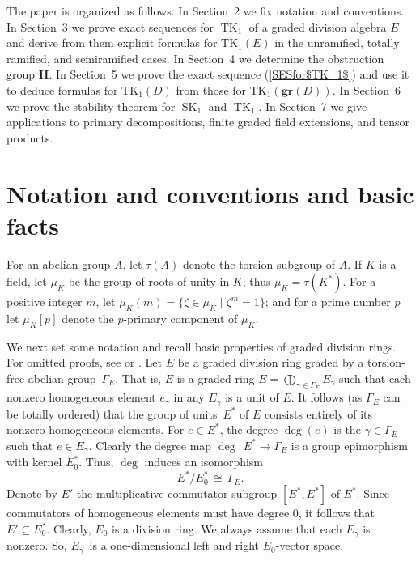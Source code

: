 \documentclass[11pt]{article}
\numberwithin{equation}{section}
\theoremstyle{plain}
\theoremstyle{remark}
\newcommand{\gr}{\mathbf{gr}}
\newcommand{\opn}{\operatorname}
\newcommand{\TK}{\opn{TK_1}}
\begin{document}
The paper is organized as follows. In Section~2 we fix notation and conventions. In Section~3 we prove exact sequences 
for $\operatorname{TK}_1$ of a graded division algebra $E$ and derive from them explicit formulas for $\TK(E)$ in the 
unramified, totally ramified, and semiramified cases. In Section~4 we determine the obstruction group $\mathbf{H}$. In 
Section~5 we prove the exact sequence (\ref{SESfor$TK_1$}) and use it to deduce formulas for $\TK(D)$ from those 
for $\TK(\gr(D))$.
In Section~6 we prove the stability theorem for $\operatorname{SK}_1$ and $\operatorname{TK}_1$. 
In Section~7 we give applications to primary decompositions, finite graded field extensions, and tensor products.


\section{Notation and conventions and basic facts}\label{sec:notation}
For an abelian group $A$, let $\tau(A)$ denote the torsion subgroup of $A$. If $K$ is a field, let $\mu_K$ be 
the group of roots of unity in $K$; thus $\mu_K = \tau(K^*)$.  For a positive integer $m$, let 
$\mu_K(m)=\{\zeta\in\mu_K\mid \zeta^m=1\}$; and for a prime number $p$ let 
$\mu_K[p]$ denote the $p$-primary component of $\mu_K$.

We next set some notation and recall basic properties of graded division rings.  For omitted proofs, see
\cite{hazrat-wadsworth-2011} or \cite{tignol-wadsworth-2015}.  Let $E$ be a graded division ring graded by 
a torsion-free abelian group~$\Gamma_E$.  That is, $E$ is a graded ring 
$E =\bigoplus_{\gamma\in \Gamma_E} E_\gamma$ such that each nonzero homogeneous element $e_\gamma$
in any $E_\gamma$ is a unit of $E$.  It follows (as $\Gamma_E$ can be totally ordered) that the group of 
units~$E^*$ of $E$ consists entirely of its nonzero homogeneous elements.  
For $e\in E^*$, the degree $\opn{deg}(e)$ is the $\gamma\in \Gamma_E$ such that $e\in E_\gamma$.  Clearly
the degree map $\deg\colon E^* \to \Gamma_E$ is  a group epimorphism with kernel $E_0^*$.  Thus, $\opn{deg}$
induces an isomorphism
\begin{equation}
\label{degiso}
E^*/E_0^* \, \cong\, \Gamma_E.
\end{equation}
Denote by $E'$
the multiplicative commutator subgroup $[E^*, E^*]$  of $E^*$.  Since commutators of homogeneous elements must 
have  degree $0$, it follows that  $E' \subseteq E_0^*$.  Clearly, $E_0$ is a division ring. We 
always assume that each $E_\gamma$ is nonzero. So, $E_\gamma$~is a one-dimensional left and right
$E_0$-vector space.  
\end{document}
